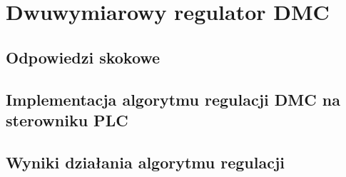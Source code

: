 \chapter{Dwuwymiarowy regulator DMC}
\label{thermal_dmc}


\section{Odpowiedzi skokowe}
\label{thermal_dmc_odp_skok}


\section{Implementacja algorytmu regulacji DMC na sterowniku PLC}
\label{thermal_dmc_impl}


\section{Wyniki działania algorytmu regulacji}
\label{thermal_dmc_wyniki}